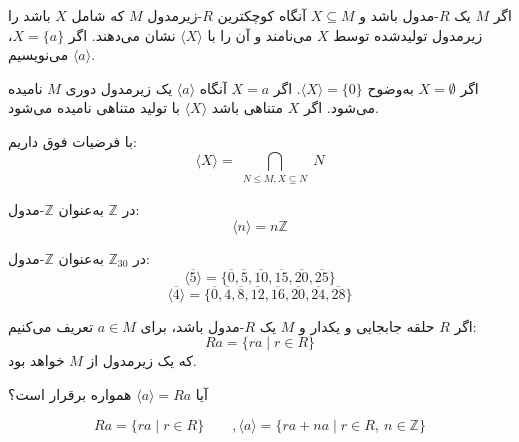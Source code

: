 \begin{definition}
    اگر $M$ یک $R$-مدول باشد و $X \subseteq M$ آنگاه کوچکترین $R$-زیرمدول $M$ که شامل $X$ باشد را زیرمدول تولیدشده توسط $X$ می‌نامند و آن را با $\langle X \rangle$ نشان می‌دهند.
    اگر $X = \{ a \}$، می‌نویسیم $\langle a \rangle$.

    اگر
    \(X = \emptyset\)
    به‌وضوح
    \(\langle X \rangle = \{0\}\).
    اگر
    \(X = {a}\)
    آنگاه
    \(\langle a \rangle\)
    یک زیرمدول دوری
    \(M\)
    نامیده می‌شود. اگر
    \(X\)
    متناهی باشد
    $\langle X \rangle$
    با تولید متناهی نامیده می‌شود.
\end{definition}

\begin{lemma}
    با فرضیات فوق داریم:
    \[
        \langle X \rangle = \bigcap_{\substack{N \leqslant M ,  X \subseteq N}} N
    \]
\end{lemma}



\begin{example}
    در $\mathbb{Z}$ به‌عنوان $\mathbb{Z}$-مدول:
    \[
        \langle n \rangle = n \mathbb{Z}
    \]

\end{example}

\begin{example}
    در $\mathbb{Z}_{30}$ به‌عنوان $\mathbb{Z}$-مدول:
    \[
        \langle \overline{5} \rangle = \{ \overline{0}, \overline{5}, \overline{10}, \overline{15}, \overline{20}, \overline{25} \}
    \]
    \[
        \langle \overline{4} \rangle = \{ \overline{0}, \overline{4}, \overline{8}, \overline{12}, \overline{16}, \overline{20}, \overline{24}, \overline{28} \}
    \]
\end{example}



\begin{definition}
    اگر $R$ حلقه جابجایی و یکدار و $M$ یک $R$-مدول باشد، برای $a \in M$ تعریف می‌کنیم:
    \[
        Ra = \{ ra \mid r \in R \}
    \]
    که یک زیرمدول از $M$ خواهد بود.

\end{definition}


\begin{remark}
    آیا $\langle a \rangle = Ra$ همواره برقرار است؟
\end{remark}


\[
    Ra = \{ ra \mid r \in R \}
    \qquad ,
    \langle a \rangle = \{ ra + na \mid r \in R,\ n \in \mathbb{Z} \}
\]

